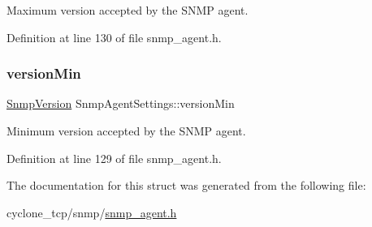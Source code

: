 Maximum version accepted by the S\+N\+MP agent. 



Definition at line 130 of file snmp\+\_\+agent.\+h.

\mbox{\label{structSnmpAgentSettings_aeeffa3bd908a4c92e8380c388c8663c4}} 
\subsubsection{\texorpdfstring{version\+Min}{versionMin}}
{\footnotesize\ttfamily \hyperlink{snmp__common_8h_a80164b0cc3de6c48aad6917f79ee95df}{Snmp\+Version} Snmp\+Agent\+Settings\+::version\+Min}



Minimum version accepted by the S\+N\+MP agent. 



Definition at line 129 of file snmp\+\_\+agent.\+h.



The documentation for this struct was generated from the following file\+:\begin{DoxyCompactItemize}
\item 
cyclone\+\_\+tcp/snmp/\hyperlink{snmp__agent_8h}{snmp\+\_\+agent.\+h}\end{DoxyCompactItemize}
